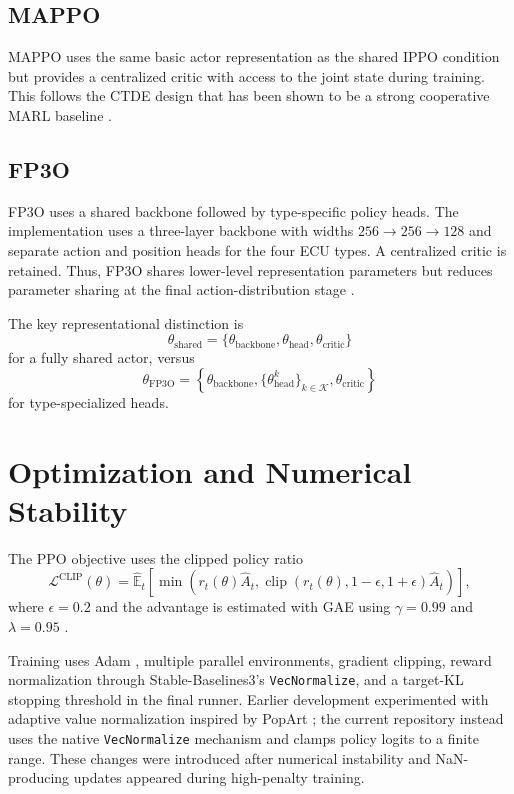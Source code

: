 \documentclass{iutbscthesis}
\begin{document}
\subsection{MAPPO}
MAPPO uses the same basic actor representation as the shared IPPO condition but provides a centralized critic with access to the joint state during training. This follows the CTDE design that has been shown to be a strong cooperative MARL baseline \parencite{yu2022surprising}.

\subsection{FP3O}
FP3O uses a shared backbone followed by type-specific policy heads. The implementation uses a three-layer backbone with widths $256\rightarrow256\rightarrow128$ and separate action and position heads for the four ECU types. A centralized critic is retained. Thus, FP3O shares lower-level representation parameters but reduces parameter sharing at the final action-distribution stage \parencite{feng2023fp3o}.

The key representational distinction is
\begin{equation}
\theta_{\mathrm{shared}}=\{\theta_{\mathrm{backbone}},\theta_{\mathrm{head}},\theta_{\mathrm{critic}}\}
\end{equation}
for a fully shared actor, versus
\begin{equation}
\theta_{\mathrm{FP3O}}=\left\{\theta_{\mathrm{backbone}},\{\theta_{\mathrm{head}}^k\}_{k\in\mathcal{K}},\theta_{\mathrm{critic}}\right\}
\end{equation}
for type-specialized heads.

\section{Optimization and Numerical Stability}
The PPO objective uses the clipped policy ratio
\begin{equation}
\mathcal{L}^{\mathrm{CLIP}}(\theta)=\hat{\mathbb{E}}_t\left[\min\left(r_t(\theta)\hat A_t,\operatorname{clip}(r_t(\theta),1-\epsilon,1+\epsilon)\hat A_t\right)\right],
\end{equation}
where $\epsilon=0.2$ and the advantage is estimated with GAE using $\gamma=0.99$ and $\lambda=0.95$ \parencite{schulman2017ppo,schulman2015trpo}.

Training uses Adam \parencite{kingma2015adam}, multiple parallel environments, gradient clipping, reward normalization through Stable-Baselines3's \texttt{VecNormalize}, and a target-KL stopping threshold in the final runner. Earlier development experimented with adaptive value normalization inspired by PopArt \parencite{hessel2019popart}; the current repository instead uses the native \texttt{VecNormalize} mechanism and clamps policy logits to a finite range. These changes were introduced after numerical instability and NaN-producing updates appeared during high-penalty training.
\end{document}
